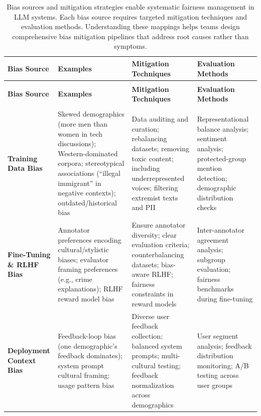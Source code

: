 {\footnotesize
\setlength{\tabcolsep}{4pt}
\renewcommand{\arraystretch}{1.2}
\begin{xltabular}{\linewidth}{@{}>{\raggedright\arraybackslash}p{2.8cm}>{\raggedright\arraybackslash}X>{\raggedright\arraybackslash}X>{\raggedright\arraybackslash}X@{}}
\caption{Bias sources and mitigation strategies enable systematic fairness management in LLM systems. Each bias source requires targeted mitigation techniques and evaluation methods. Understanding these mappings helps teams design comprehensive bias mitigation pipelines that address root causes rather than symptoms.}
\label{tab:ch11_bias_mitigation}\\
\toprule
{}
\textbf{Bias Source} & \textbf{Examples} & \textbf{Mitigation Techniques} & \textbf{Evaluation Methods} \\
\midrule
\endfirsthead
{}\\
\toprule
{}
\textbf{Bias Source} & \textbf{Examples} & \textbf{Mitigation Techniques} & \textbf{Evaluation Methods} \\
\midrule
\endhead
\midrule
{}\\
\endfoot
\bottomrule
\endlastfoot
\textbf{Training Data Bias} & Skewed demographics (more men than women in tech discussions); Western-dominated corpora; stereotypical associations (``illegal immigrant'' in negative contexts); outdated/historical bias \cite{ar5iv_labs} & Data auditing and curation; rebalancing datasets; removing toxic content; including underrepresented voices; filtering extremist texts and PII \cite{bcg2023} & Representational balance analysis; sentiment analysis; protected-group mention detection; demographic distribution checks \\
\addlinespace[2pt]
\textbf{Fine-Tuning \& RLHF Bias} & Annotator preferences encoding cultural/stylistic biases; evaluator framing preferences (e.g., crime explanations); RLHF reward model bias & Ensure annotator diversity; clear evaluation criteria; counterbalancing datasets; bias-aware RLHF; fairness constraints in reward models & Inter-annotator agreement analysis; subgroup evaluation; fairness benchmarks during fine-tuning \\
\addlinespace[2pt]
\textbf{Deployment Context Bias} & Feedback-loop bias (one demographic's feedback dominates); system prompt cultural framing; usage pattern bias & Diverse user feedback collection; balanced system prompts; multi-cultural testing; feedback normalization across demographics & User segment analysis; feedback distribution monitoring; A/B testing across user groups \\

\end{xltabular}}
